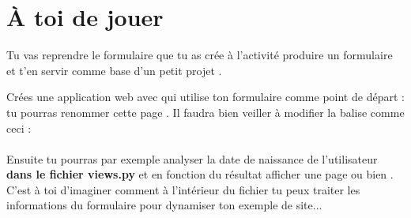 \documentclass[a4paper,11pt]{book}
\begin{document}
\section*{À toi de jouer}

Tu vas reprendre le formulaire que tu as crée à l'activité \og produire un formulaire\fg{} et t'en servir comme base d'un petit projet .

\begin{exercice}[]
Crées une application web avec  qui utilise ton formulaire comme point de départ : tu pourras renommer cette page . Il faudra bien veiller à modifier la balise  comme ceci :\\

\\

Ensuite tu pourras par exemple analyser la date de naissance de l'utilisateur \textbf{dans le fichier views.py} et en fonction du résultat afficher une page  ou bien  .\\
C'est à toi d'imaginer comment à l'intérieur du fichier  tu peux traiter les informations du formulaire pour dynamiser ton exemple de site...
\end{exercice}
\end{document}
